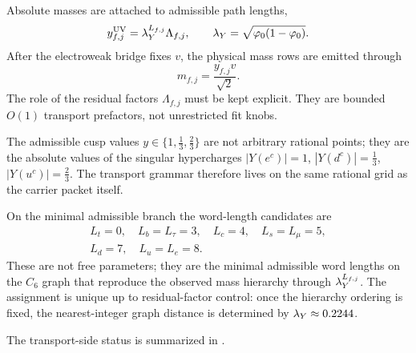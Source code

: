 Absolute masses are attached to admissible path lengths,
\begin{equation}
\label{eq:path-length-yukawa}
y_{f,j}^{\mathrm{UV}}=\lambda_Y^{L_{f,j}}\Lambda_{f,j},
\qquad
\lambda_Y=\sqrt{\varphi_0(1-\varphi_0)}.
\end{equation}
After the electroweak bridge fixes $v$, the physical mass rows are emitted through
\begin{equation}
\label{eq:mass-bridge}
m_{f,j}=\frac{y_{f,j}v}{\sqrt2}.
\end{equation}
The role of the residual factors $\Lambda_{f,j}$ must be kept explicit. They are bounded $O(1)$ transport prefactors, not unrestricted fit knobs.

\begin{remark}
The admissible cusp values $y\in\{1,\frac13,\frac23\}$ are not arbitrary rational points; they are the absolute values of the singular hypercharges $|Y(e^c)|=1$, $|Y(d^c)|=\frac13$, $|Y(u^c)|=\frac23$. The transport grammar therefore lives on the same rational grid as the carrier packet itself.
\end{remark}

On the minimal admissible branch the word-length candidates are
\begin{equation}
\label{eq:minimal-word-lengths}
\begin{gathered}
L_t=0,\quad
L_b=L_\tau=3,\quad
L_c=4,\quad
L_s=L_\mu=5,\\
L_d=7,\quad
L_u=L_e=8.
\end{gathered}
\end{equation}
These are not free parameters; they are the minimal admissible word lengths on the $C_6$ graph that reproduce the observed mass hierarchy through $\lambda_Y^{L_{f,j}}$. The assignment is unique up to residual-factor control: once the hierarchy ordering is fixed, the nearest-integer graph distance is determined by $\lambda_Y\approx\num{0.2244}$.

The transport-side status is summarized in .

